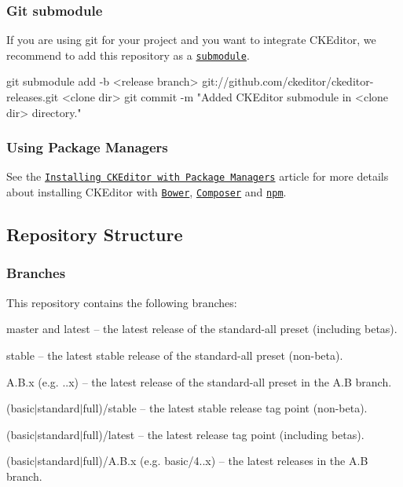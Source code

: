 \subsubsection*{Git submodule}

If you are using git for your project and you want to integrate C\+K\+Editor, we recommend to add this repository as a \href{http://git-scm.com/book/en/Git-Tools-Submodules}{\tt submodule}. \begin{DoxyVerb}git submodule add -b <release branch> git://github.com/ckeditor/ckeditor-releases.git <clone dir>
git commit -m "Added CKEditor submodule in <clone dir> directory."
\end{DoxyVerb}


\subsubsection*{Using Package Managers}

See the \href{http://docs.ckeditor.com/#!/guide/dev_package_managers}{\tt Installing C\+K\+Editor with Package Managers} article for more details about installing C\+K\+Editor with \href{http://bower.io/}{\tt Bower}, \href{https://getcomposer.org/}{\tt Composer} and \href{https://www.npmjs.com/}{\tt npm}.

\subsection*{Repository Structure}

\subsubsection*{Branches}

This repository contains the following branches\+:


\begin{DoxyItemize}
\item {\ttfamily master} and {\ttfamily latest} -- the latest release of the {\ttfamily standard-\/all} preset (including betas).
\item {\ttfamily stable} -- the latest stable release of the {\ttfamily standard-\/all} preset (non-\/beta).
\item {\ttfamily A.\+B.\+x} (e.\+g. {..\+x}) -- the latest release of the {\ttfamily standard-\/all} preset in the {\ttfamily A.\+B} branch.
\item {\ttfamily (basic$\vert$standard$\vert$full)/stable} -- the latest stable release tag point (non-\/beta).
\item {\ttfamily (basic$\vert$standard$\vert$full)/latest} -- the latest release tag point (including betas).
\item {\ttfamily (basic$\vert$standard$\vert$full)/A.B.\+x} (e.\+g. {\ttfamily basic/4..\+x}) -- the latest releases in the {\ttfamily A.\+B} branch.
\end{DoxyItemize}

